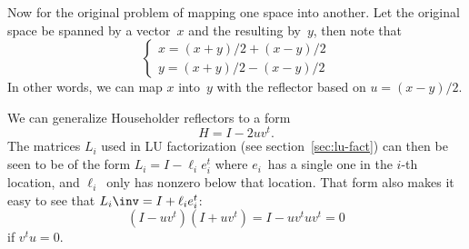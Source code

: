 Now for the original problem of mapping one space into another. Let the original space be spanned
by a vector~$x$ and the resulting by~$y$, then note that 
\[ 
\begin{cases}
x = (x+y)/2 + (x-y)/2\\ y = (x+y)/2 - (x-y)/2
\end{cases}
\]
In other words, we can map $x$ into~$y$ with the reflector based on $u=(x-y)/2$.

We can generalize Householder reflectors to a form \[ H=I-2uv^t. \]
The matrices $L_i$ used in LU factorization (see section~\ref{sec:lu-fact})
can then be seen to be of the form $L_i = I-\ell_ie_i^t$ where $e_i$~has a single one
in the $i$-th location, and $\ell_i$~only has nonzero below that location.
That form also makes it easy to see that $L_i\inv = I+\ell_ie_i^t$:
\[ (I-uv^t)(I+uv^t) = I-uv^tuv^t = 0 \]
if $v^tu=0$.


